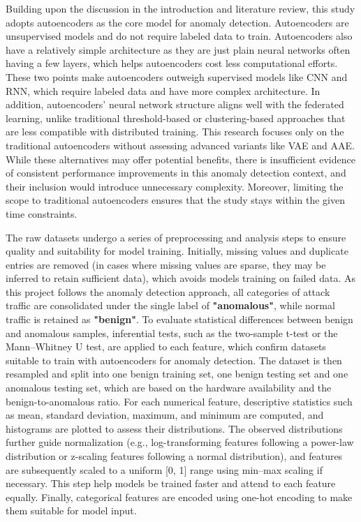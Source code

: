 Building upon the discussion in the introduction and literature review, this study adopts autoencoders as the core model for anomaly detection. Autoencoders are unsupervised models and do not require labeled data to train. Autoencoders also have a relatively simple architecture as they are just plain neural networks often having a few layers, which helps autoencoders cost less computational efforts. These two points make autoencoders outweigh supervised models like CNN and RNN, which require labeled data and have more complex architecture. In addition, autoencoders' neural network structure aligns well with the federated learning, unlike traditional threshold-based or clustering-based approaches that are less compatible with distributed training. This research focuses only on the traditional autoencoders without assessing advanced variants like VAE and AAE. While these alternatives may offer potential benefits, there is insufficient evidence of consistent performance improvements in this anomaly detection context, and their inclusion would introduce unnecessary complexity. Moreover, limiting the scope to traditional autoencoders ensures that the study stays within the given time constraints.

The raw datasets undergo a series of preprocessing and analysis steps to ensure quality and suitability for model training. Initially, missing values and duplicate entries are removed (in cases where missing values are sparse, they may be inferred to retain sufficient data), which avoids models training on failed data. As this project follows the anomaly detection approach, all categories of attack traffic are consolidated under the single label of \textbf{"anomalous"}, while normal traffic is retained as \textbf{"benign"}. To evaluate statistical differences between benign and anomalous samples, inferential tests, such as the two-sample t-test or the Mann–Whitney U test, are applied to each feature, which confirm datasets suitable to train with autoencoders for anomaly detection. The dataset is then resampled and split into one benign training set, one benign testing set and one anomalous testing set, which are based on the hardware availability and the benign-to-anomalous ratio. For each numerical feature, descriptive statistics such as mean, standard deviation, maximum, and minimum are computed, and histograms are plotted to assess their distributions. The observed distributions further guide normalization (e.g., log-transforming features following a power-law distribution or z-scaling features following a normal distribution), and features are subsequently scaled to a uniform [0, 1] range using min–max scaling if necessary. This step help models be trained faster and attend to each feature equally. Finally, categorical features are encoded using one-hot encoding to make them suitable for model input.

